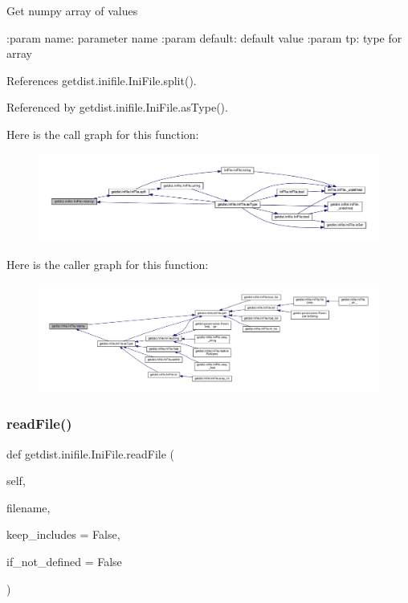 \begin{DoxyVerb}Get numpy array of values

:param name: parameter name
:param default: default value
:param tp: type for array
\end{DoxyVerb}
 

References getdist.\+inifile.\+Ini\+File.\+split().



Referenced by getdist.\+inifile.\+Ini\+File.\+as\+Type().

Here is the call graph for this function\+:
\nopagebreak
\begin{figure}[H]
\begin{center}
\leavevmode
\includegraphics[width=350pt]{classgetdist_1_1inifile_1_1IniFile_a18e5f6bbc80b9ab0b7e9ebeff9eff3ec_cgraph}
\end{center}
\end{figure}
Here is the caller graph for this function\+:
\nopagebreak
\begin{figure}[H]
\begin{center}
\leavevmode
\includegraphics[width=350pt]{classgetdist_1_1inifile_1_1IniFile_a18e5f6bbc80b9ab0b7e9ebeff9eff3ec_icgraph}
\end{center}
\end{figure}
\mbox{\label{classgetdist_1_1inifile_1_1IniFile_a732b3b9d1e3a91cf678a8f47019ed010}} 
\subsubsection{\texorpdfstring{read\+File()}{readFile()}}
{\footnotesize\ttfamily def getdist.\+inifile.\+Ini\+File.\+read\+File (\begin{DoxyParamCaption}\item[{}]{self,  }\item[{}]{filename,  }\item[{}]{keep\+\_\+includes = {\ttfamily False},  }\item[{}]{if\+\_\+not\+\_\+defined = {\ttfamily False} }\end{DoxyParamCaption})}



